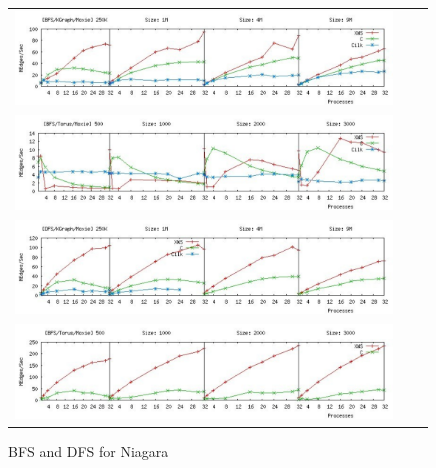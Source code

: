\documentclass[10pt]{ieee}
\numberwithin{equation}{section}
\begin{document}
\begin{figure}
\begin{center}
 \begin{tabular}{ccc}
\includegraphics[width=10cm]{plots/bfs-kgraph-moxie-color.pdf} \\
\includegraphics[width=10cm]{plots/bfs-torus-moxie-color.pdf} \\
\includegraphics[width=10cm]{plots/dfs-kgraph-moxie-color.pdf}\\
\includegraphics[width=10cm]{plots/dfs-torus-moxie-color.pdf}\\

 \end{tabular}
\caption{BFS and DFS for Niagara}\label{moxie}
\end{center}
\end{figure}
\end{document}
